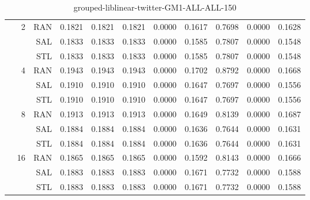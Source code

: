 \begin{center}
\begin{table}[htbp]
\begin{tabular}{ | r | r | r | r | r | r | r | r | r | r | r |}
 & \multirow{3}{*}{2} & RAN & 0.1821 & 0.1821 & 0.1821 & 0.0000 & 0.1617 & 0.7698 & 0.0000 & 0.1628\\ \cline{3-11}
 &   & SAL & 0.1833 & 0.1833 & 0.1833 & 0.0000 & 0.1585 & 0.7807 & 0.0000 & 0.1548\\ \cline{3-11}
 &   & STL & 0.1833 & 0.1833 & 0.1833 & 0.0000 & 0.1585 & 0.7807 & 0.0000 & 0.1548\\ \cline{2-11}
 & \multirow{3}{*}{4} & RAN & 0.1943 & 0.1943 & 0.1943 & 0.0000 & 0.1702 & 0.8792 & 0.0000 & 0.1668\\ \cline{3-11}
 &   & SAL & 0.1910 & 0.1910 & 0.1910 & 0.0000 & 0.1647 & 0.7697 & 0.0000 & 0.1556\\ \cline{3-11}
 &   & STL & 0.1910 & 0.1910 & 0.1910 & 0.0000 & 0.1647 & 0.7697 & 0.0000 & 0.1556\\ \cline{2-11}
 & \multirow{3}{*}{8} & RAN & 0.1913 & 0.1913 & 0.1913 & 0.0000 & 0.1649 & 0.8139 & 0.0000 & 0.1687\\ \cline{3-11}
 &   & SAL & 0.1884 & 0.1884 & 0.1884 & 0.0000 & 0.1636 & 0.7644 & 0.0000 & 0.1631\\ \cline{3-11}
 &   & STL & 0.1884 & 0.1884 & 0.1884 & 0.0000 & 0.1636 & 0.7644 & 0.0000 & 0.1631\\ \cline{2-11}
 & \multirow{3}{*}{16} & RAN & 0.1865 & 0.1865 & 0.1865 & 0.0000 & 0.1592 & 0.8143 & 0.0000 & 0.1666\\ \cline{3-11}
 &   & SAL & 0.1883 & 0.1883 & 0.1883 & 0.0000 & 0.1671 & 0.7732 & 0.0000 & 0.1588\\ \cline{3-11}
 &   & STL & 0.1883 & 0.1883 & 0.1883 & 0.0000 & 0.1671 & 0.7732 & 0.0000 & 0.1588\\ \cline{2-11}
\hline
\end{tabular}
\caption{grouped-liblinear-twitter-GM1-ALL-ALL-150}
\end{table}
\end{center}


